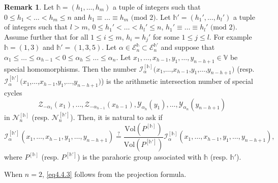 \documentclass[11pt,oneside]{amsart}
\theoremstyle{plain}
\theoremstyle{definition}
\newtheorem{remark}[theorem]{Remark}
\theoremstyle{remark}
\newcommand{\tx}[1]{\text{#1}}
\newcommand{\BV}{{\mathbb V}}
\newcommand{\CE}{{\mathcal E}}
\newcommand{\CI}{{\mathcal I}}
\newcommand{\CN}{{\mathcal N}}
\newcommand{\CY}{{\mathcal Y}}
\newcommand{\CZ}{{\mathcal Z}}
\numberwithin{equation}{section}
\begin{document}
	\begin{remark}\label{remark4.6}
		Let $\mathds{h}=(h_1,\dots,h_m)$ a tuple of integers such that $0 \leq h_1<\dots<h_m \leq n$ and $h_1 \equiv \dots \equiv h_m \tx{ (mod 2})$. Let $\mathds{h'}=(h_1',\dots,h_l')$ a tuple of integers such that $l>m$, $0 \leq h_1'<\dots<h_l'\leq n$, $h_1' \equiv \dots \equiv h_l' \tx{ (mod 2})$. Assume further that for all $1 \leq i \leq m$, $h_i=h_j'$ for some $1 \leq j \leq l$. For example $\mathds{h}=(1,3)$ and $\mathds{h}'=(1,3,5)$. Let $\alpha \in \CE_{n}^{\mathds{h}} \subset \CE_{n}^{\mathds{h}'}$ and suppose that $\alpha_1 \leq \dots \leq \alpha_{h-1} < 0 \leq \alpha_h\leq \dots \leq \alpha_n$. Let $x_1,\dots,x_{h-1},y_1,\dots,y_{n-h+1} \in \BV$ be special homomorphisms. Then the number $\CI_{\alpha}^{[\mathds{h}]}(x_1$,$\dots$,$x_{h-1}$,$y_1$,$\dots$,$y_{n-h+1})$ (resp. $\CI_{\alpha}^{[\mathds{h}']}(x_1$,$\dots$,$x_{h-1}$,$y_1$,$\dots$,$y_{n-h+1})$) is the arithmetic intersection number of special cycles
		\begin{equation*}
			\CZ_{-\alpha_1}(x_1),\dots,\CZ_{-\alpha_{h-1}}(x_{h-1}),\CY_{\alpha_h}(y_1),\dots,\CY_{\alpha_{n}}(y_{n-h+1})
		\end{equation*}
		in $\CN_n^{[\mathds{h}]}$ (resp. $\CN_n^{[\mathds{h}']}$). Then, it is natural to ask if
		\begin{equation}\label{eq4.4.3}
			\CI_{\alpha}^{[\mathds{h}']}(x_1,\dots,x_{h-1},y_1,\dots,y_{n-h+1})\overset{?}{=}\dfrac{\tx{Vol}(P^{[\mathds{h}]})}{\tx{Vol}(P^{[\mathds{h}']})}	\CI_{\alpha}^{[\mathds{h}]}(x_1,\dots,x_{h-1},y_1,\dots,y_{n-h+1}),
		\end{equation}
		where $P^{[\mathds{h}]}$ (resp. $P^{[\mathds{h}']}$) is the parahoric group associated with $\mathds{h}$ (resp. $\mathds{h}'$).
		
		When $n=2$, \eqref{eq4.4.3} follows from the projection formula.
	\end{remark}
	
	
	
	
	
	
	
\end{document}
